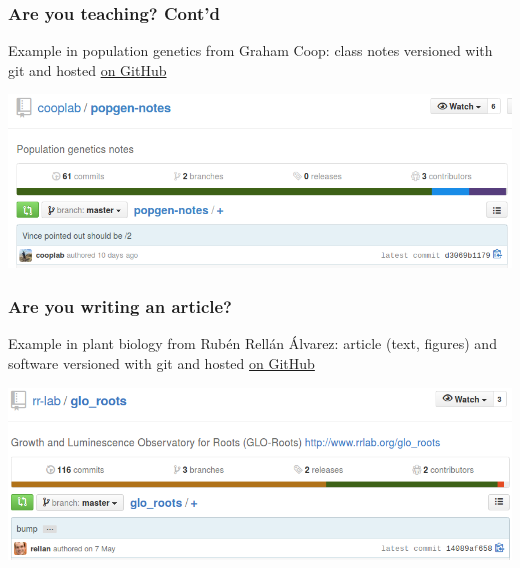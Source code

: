 \documentclass[c]{beamer} %
\begin{document}
\begin{frame}
  \frametitle{Are you teaching? Cont'd}
  Example in \alert{population genetics} from Graham Coop: class notes versioned with git and hosted \href{https://github.com/cooplab/popgen-notes}{on GitHub}
  
  \bigskip
  
  \begin{center}
    \includegraphics[width=\textwidth,height=\textheight,keepaspectratio=true]{cooplab_popgen}%
  \end{center}
\end{frame}  

\begin{frame}
  \frametitle{Are you writing an article?}
  Example in \alert{plant biology} from Rubén Rellán Álvarez: article (text, figures) and software versioned with git and hosted \href{https://github.com/rr-lab/glo_roots}{on GitHub}
  
  \bigskip
  
  \begin{center}
    \includegraphics[width=\textwidth,height=\textheight,keepaspectratio=true]{rrlab_roots}%
  \end{center}
\end{frame}
\end{document}
